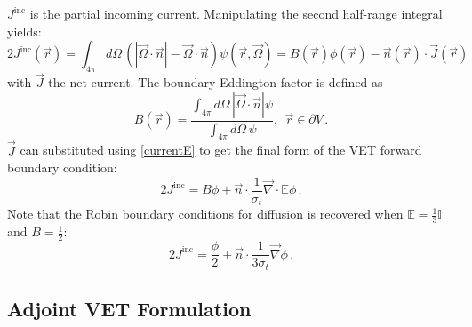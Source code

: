 \documentclass[12pt]{report}
\newcommand{\vr}{\vec{r}}
\newcommand{\vJ}{\vec{J}}
\newcommand{\vO}{\vec{\Omega}}
\renewcommand{\div}{\vec{\nabla} \cdot}
\newcommand{\grad}{\vec{\nabla}}
\newcommand{\bound}{\partial V}
\newcommand{\vn}{\vec{n}}
\newcommand{\Edd}{\mathbb{E}}
\newcommand{\BEdd}{B}
\newcommand{\sigt}{\sigma_t}
\begin{document}
$J^{\text{inc}}$ is the partial incoming current. 
Manipulating the second half-range integral yields:
\begin{equation}
2 J^{\text{inc}}(\vr) = \int_{4\pi} d \Omega\,  \left( | \vO \cdot \vn |- \vO\cdot\vn\right)  \psi(\vr,\vO) 
= \BEdd(\vr) \phi(\vr) - \vn(\vr) \cdot \vJ(\vr)
\end{equation}
with $\vJ$ the net current. The boundary Eddington factor is defined as
\begin{equation}
\BEdd(\vr) = \frac{\int_{4 \pi} d\Omega \, | \vO \cdot \vn | \psi}{\int_{4\pi} d\Omega \, \psi} ,\ \ \vr \in \bound \,.
\end{equation}
$\vJ$ can substituted using \eqref{currentE} to get the final form of the VET forward boundary condition:
\begin{equation}
2 J^{\text{inc}} = \BEdd \phi + \vn \cdot \frac{1}{\sigt} \div \Edd \phi \,.
\end{equation}
Note that the Robin boundary conditions for diffusion is recovered when $\Edd = \tfrac{1}{3} \mathbb{I}$ and $B=\tfrac{1}{2}$:
\[
2 J^{\text{inc}} = \frac{\phi}{2} + \vn \cdot \frac{1}{3\sigt} \grad \phi \,.
\]


\subsection{Adjoint VET Formulation}
\end{document}
